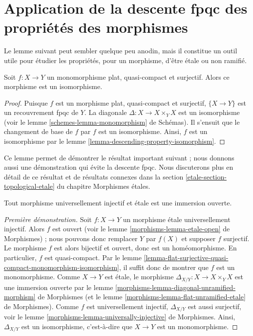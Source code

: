 \section[Application de la descente fpqc]{Application de la descente fpqc des propriétés des morphismes}
\label{section-application-descending-properties-morphisms}

\noindent
Le lemme suivant peut sembler quelque peu anodin, mais il constitue un outil
utile pour étudier les propriétés, pour un morphisme, d'être \'etale ou non
ramifié.

\begin{lemma}
\label{lemma-flat-surjective-quasi-compact-monomorphism-isomorphism}
Soit $f : X \to Y$ un monomorphisme plat, quasi-compact et surjectif.
Alors ce morphisme est un isomorphisme.
\end{lemma}

\begin{proof}
Puisque $f$ est un morphisme plat, quasi-compact et surjectif,
$\{X \to Y\}$ est un recouvrement fpqc de $Y$.
La diagonale $\Delta : X \to X \times_Y X$ est un isomorphisme
(voir le lemme \ref{schemes-lemma-monomorphism} de Schémas).
Il s'ensuit que le changement de base de $f$ par $f$ est un
isomorphisme. Ainsi, $f$ est un isomorphisme par le
lemme \ref{lemma-descending-property-isomorphism}.
\end{proof}

\noindent
Ce lemme permet de démontrer le résultat important suivant ; nous donnons aussi
une démonstration qui évite la descente fpqc.
Nous discuterons plus en détail de ce résultat et de résultats connexes dans
la section \ref{etale-section-topological-etale} du chapitre Morphismes étales.

\begin{lemma}
\label{lemma-universally-injective-etale-open-immersion}
Tout morphisme universellement injectif et \'etale est une immersion ouverte.
\end{lemma}

\begin{proof}[Première démonstration]
Soit $f : X \to Y$ un morphisme \'etale universellement injectif.
Alors $f$ est ouvert
(voir le lemme \ref{morphisms-lemma-etale-open} de Morphismes) ;
nous pouvons donc remplacer $Y$ par $f(X)$ et supposer $f$ surjectif.
Le morphisme $f$ est alors bijectif et ouvert, donc est un homéomorphisme.
En particulier, $f$ est quasi-compact. Par le
lemme \ref{lemma-flat-surjective-quasi-compact-monomorphism-isomorphism},
il suffit donc de montrer que $f$ est un monomorphisme.
Comme $X \to Y$ est \'etale, le morphisme
$\Delta_{X/Y} : X \to X \times_Y X$ est une immersion ouverte par
le lemme \ref{morphisms-lemma-diagonal-unramified-morphism} de Morphismes
(et le lemme \ref{morphisms-lemma-flat-unramified-etale} de Morphismes).
Comme $f$ est universellement injectif, $\Delta_{X/Y}$ est aussi surjectif,
voir le lemme \ref{morphisms-lemma-universally-injective} de Morphismes.
Ainsi, $\Delta_{X/Y}$ est un isomorphisme, c'est-à-dire que
$X \to Y$ est un monomorphisme.
\end{proof}

